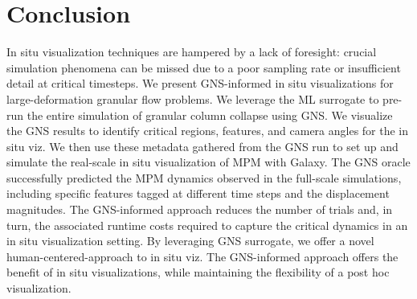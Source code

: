 \documentclass{vgtc}
\begin{document}
\section{Conclusion}
\label{sec:conclusion}
In situ visualization techniques are hampered by a lack of foresight: crucial simulation phenomena can be missed due to a poor sampling rate or insufficient detail at critical timesteps. We present GNS-informed in situ visualizations for large-deformation granular flow problems. We leverage the ML surrogate to pre-run the entire simulation of granular column collapse using GNS. We visualize the GNS results to identify critical regions, features, and camera angles for the in situ viz. We then use these metadata gathered from the GNS run to set up and simulate the real-scale in situ visualization of MPM with Galaxy. The GNS oracle successfully predicted the MPM dynamics observed in the full-scale simulations, including specific features tagged at different time steps and the displacement magnitudes. The GNS-informed approach reduces the number of trials and, in turn, the associated runtime costs required to capture the critical dynamics in an in situ visualization setting. By leveraging GNS surrogate, we offer a novel human-centered-approach to in situ viz. The GNS-informed approach offers the benefit of in situ visualizations, while maintaining the flexibility of a post hoc visualization.


% 


\end{document}
